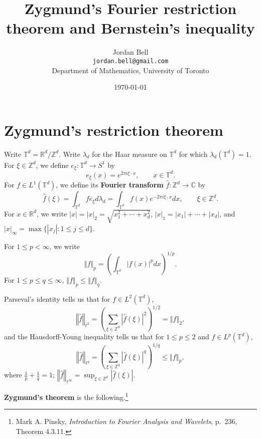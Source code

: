 \documentclass{article}
\newcommand{\norm}[1]{\left\Vert #1 \right\Vert}
\theoremstyle{definition}
\begin{document}
\title{Zygmund's Fourier restriction theorem and Bernstein's inequality}
\author{Jordan Bell\\ \texttt{jordan.bell@gmail.com}\\Department of Mathematics, University of Toronto}
\date{\today}

\maketitle

\section{Zygmund's restriction theorem}
Write $\mathbb{T}^d = \mathbb{R}^d / \mathbb{Z}^d$.
Write $\lambda_d$ for  the Haar measure on $\mathbb{T}^d$ for which $\lambda_d(\mathbb{T}^d)=1$. 
For $\xi \in \mathbb{Z}^d$, we define $e_\xi:\mathbb{T}^d \to S^1$ by
\[
e_\xi(x) = e^{2\pi i\xi\cdot x}, \qquad x \in \mathbb{T}^d.
\]
For
$f \in L^1(\mathbb{T}^d)$, we define its \textbf{Fourier transform} $\hat{f}:\mathbb{Z}^d \to \mathbb{C}$
by
\[
\hat{f}(\xi) =\int_{\mathbb{T}^d} f \overline{e_\xi} d\lambda_d=  \int_{\mathbb{T}^d} f(x) e^{-2\pi i\xi\cdot x} dx, \qquad \xi\in\mathbb{Z}^d.
\]
For $x \in \mathbb{R}^d$, we write $|x|=|x|_2=\sqrt{x_1^2+\cdots+x_d^2}$,
$|x|_1 = |x_1|+\cdots+|x_d|$, and
$|x|_\infty=\max \{|x_j|: 1 \leq j \leq d\}$.



For $1 \leq p < \infty$, we write
\[
\norm{f}_p  = \left( \int_{\mathbb{T}^d} |f(x)|^p dx \right)^{1/p}.
\]
For $1 \leq p \leq q \leq \infty$, $\norm{f}_p \leq \norm{f}_q$.

Parseval's identity tells us that for $f \in L^2(\mathbb{T}^d)$,
\[
\norm{\hat{f}}_{\ell^2} = \left( \sum_{\xi \in \mathbb{Z}^d} |\hat{f}(\xi)|^2 \right)^{1/2} = \norm{f}_2,
\]
and the Hausdorff-Young inequality tells us that for $1 \leq p \leq 2$ and $f \in L^p(\mathbb{T}^d)$, 
\[
\norm{\hat{f}}_{\ell^q} = \left( \sum_{\xi \in \mathbb{Z}^d} |\hat{f}(\xi)|^q \right)^{1/q} \leq 
\norm{f}_p,
\]
where $\frac{1}{p}+\frac{1}{q}=1$; $\norm{\hat{f}}_{\ell^\infty}=\sup_{\xi \in \mathbb{Z}^d} |\hat{f}(\xi)|$.


\textbf{Zygmund's theorem} is the following.\footnote{Mark A. Pinsky, {\em Introduction to Fourier Analysis and Wavelets}, p.~236, Theorem 4.3.11.}
\end{document}
